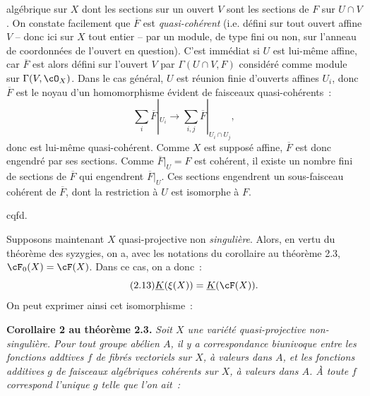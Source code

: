 algébrique sur $X$ dont les sections sur un ouvert $V$ sont les sections de $F$ sur $U\cap V$. On constate facilement que $\overline F$ est \emph{quasi-cohérent} (i.e. défini sur tout ouvert affine $V$ -- donc ici sur $X$ tout entier -- par un module, de type fini ou non, sur l'anneau de coordonnées de l'ouvert en question). C'est immédiat si $U$ est lui-même affine, car $\overline F$ est alors défini sur l'ouvert $V$ par $\Gamma(U\cap V,F)$ considéré comme module sur $\Gamma(V,\cO_X)$. Dans le cas général, $U$ est réunion finie d'ouverts affines $U_i$, donc $\overline F$ est le noyau d'un homomorphisme évident de faisceaux quasi-cohérents~:
\[
 \sum_i \overline F|_{U_i}\longrightarrow \sum_{i,j}\overline F|_{U_i\cap U_j},
\]
donc est lui-même quasi-cohérent. Comme $X$ est supposé affine, $\overline F$ est donc engendré par ses sections. Comme $\overline F|_U=F$ est cohérent, il existe un nombre fini de sections de $\overline F$ qui engendrent $\overline F|_U$. Ces sections engendrent un sous-faisceau cohérent de $\overline F$, dont la restriction à $U$ est isomorphe à $F$.
\begin{flushright}cqfd.\end{flushright}

Supposons maintenant $X$ quasi-projective non \emph{singulière}. Alors, en vertu du théorème des syzygies, on a, avec les notations du corollaire au théorème 2.3, $\cF_0(X)=\cF(X)$. Dans ce cas, on a donc~:
\begin{equation}\tag{2.13}
 \underline{K}(\xi(X))=\underline{K}(\cF(X)).
\end{equation}
On peut exprimer ainsi cet isomorphisme~:

\textbf{Corollaire 2 au théorème 2.3.} \emph{Soit $X$ une variété quasi-projective non-singulière. Pour tout groupe abélien $A$, il y a correspondance biunivoque entre les fonctions addtives $f$ de fibrés vectoriels sur $X$, à valeurs dans $A$, et les fonctions additives $g$ de faisceaux algébriques cohérents sur $X$, à valeurs dans $A$. À toute $f$ correspond l'unique $g$ telle que l'on ait~:}
